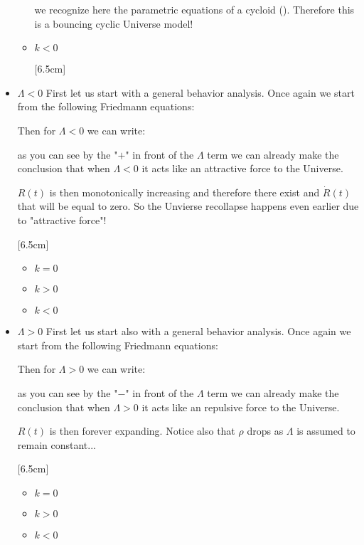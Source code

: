 \begin{itemize}
\begin{itemize}
				we recognize here the parametric equations of a cycloid (). Therefore this is a bouncing cyclic Universe model!
							
				\item $k<0$
				
				[6.5cm]
			\end{itemize}
	
		\item $\Lambda<0$
			First let us start with a general behavior analysis. Once again we start from the following Friedmann equations:
			
			Then for $\Lambda <0$ we can write:
			
			as you can see by the "$+$" in front of the $\Lambda$ term we can already make the conclusion that when $\Lambda<0$ it acts like an attractive force to the Universe.
			
			$R(t)$ is then monotonically increasing and therefore there exist and $\dot{R}(t)$ that will be equal to zero. So the Unvierse recollapse happens even earlier due to "attractive force"!
		
			[6.5cm]
			\begin{itemize}
				\item $k=0$
				\item $k>0$
				\item $k<0$
			\end{itemize}
	
		\item $\Lambda>0$
			First let us start also with a general behavior analysis. Once again we start from the following Friedmann equations:
			
			Then for $\Lambda >0$ we can write:
			
			as you can see by the "$-$" in front of the $\Lambda$ term we can already make the conclusion that when $\Lambda>0$ it acts like an repulsive force to the Universe.
			
			$R(t)$ is then forever expanding. Notice also that $\rho$ drops as $\Lambda$ is assumed to remain constant...
			
			[6.5cm]
			\begin{itemize}
				\item $k=0$
				\item $k>0$
				\item $k<0$
			\end{itemize}
	\end{itemize}
	
